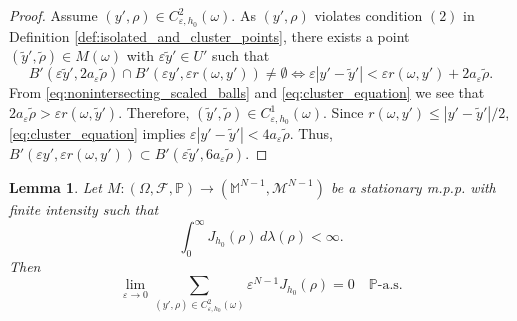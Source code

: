 \documentclass{article}
\numberwithin{equation}{section}
\newtheorem{lemma}[theorem]{Lemma}
\theoremstyle{definition}
\theoremstyle{remark}
\begin{document}
\begin{proof}
    Assume $(y', \rho) \in C_{\varepsilon, h_0}^2(\omega)$. As $(y', \rho)$ violates condition $(2)$ in Definition \ref{def:isolated_and_cluster_points}, there exists a point $(\tilde{y}', \tilde{\rho}) \in M(\omega)$ with $\varepsilon \tilde{y}' \in U'$ such that
    \begin{equation} \label{eq:cluster_equation}
        B'(\varepsilon \tilde{y}', 2 a_\varepsilon \tilde{\rho}) \cap B'(\varepsilon y', \varepsilon r(\omega, y')) \neq \emptyset \iff \varepsilon |y' - \tilde{y}'| < \varepsilon r(\omega, y') + 2 a_\varepsilon \tilde{\rho}.
    \end{equation}
    From \eqref{eq:nonintersecting_scaled_balls} and \eqref{eq:cluster_equation} we see that $2 a_\varepsilon \tilde{\rho} > \varepsilon r(\omega, \tilde{y}')$. Therefore, $(\tilde{y}', \tilde{\rho}) \in C_{\varepsilon, h_0}^1(\omega)$. Since $r(\omega, y') \le |y' - \tilde{y}'|/2$, \eqref{eq:cluster_equation} implies $\varepsilon |y' - \tilde{y}'| < 4 a_\varepsilon \tilde{\rho}$. Thus, $B'(\varepsilon y', \varepsilon r(\omega, y')) \subset B'(\varepsilon \tilde{y}', 6 a_\varepsilon \tilde{\rho})$.
\end{proof}

\begin{lemma} \label{lm:negligible_cluster_2}
    Let $M :(\Omega, \mathcal{F}, \mathbb{P}) \rightarrow (\mathbb{M}^{N - 1}, \mathcal{M}^{N - 1})$ be a stationary m.p.p. with finite intensity such that
    \[
    \int_0^\infty J_{h_0}(\rho) \, d\lambda(\rho) < \infty.
    \]
    Then
    \[
    \lim_{\varepsilon \to 0} \sum_{(y', \rho) \in C_{\varepsilon, h_0}^2(\omega)} \varepsilon^{N - 1} J_{h_0}(\rho) = 0 \quad \mathbb{P}\text{-a.s.}
    \]
\end{lemma}
\end{document}
